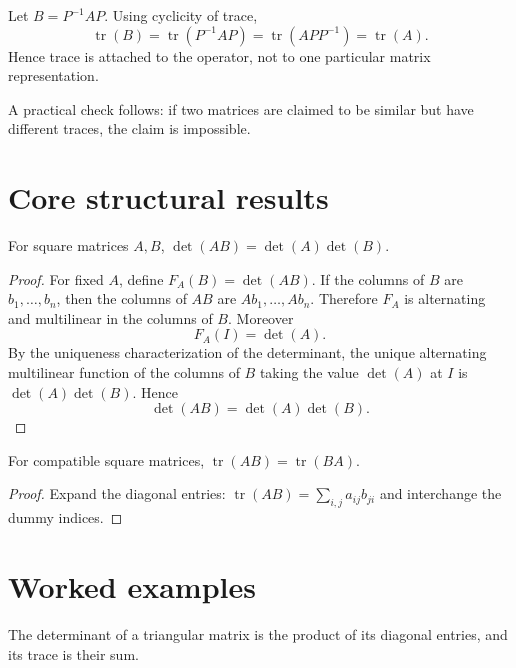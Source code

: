 \begin{example}\label{ex:i08-expand-03}
Let \(B=P^{-1}AP\). Using cyclicity of trace,
\[
\operatorname{tr}(B)
=\operatorname{tr}(P^{-1}AP)
=\operatorname{tr}(APP^{-1})
=\operatorname{tr}(A).
\]
Hence trace is attached to the operator, not to one particular matrix
representation.

A practical check follows: if two matrices are claimed to be similar but have
different traces, the claim is impossible.
\end{example}
\section{Core structural results}

\begin{theorem}\label{thm:i08-01}
For square matrices $A,B$, $\det(AB)=\det(A)\det(B)$.
\begin{proof}
For fixed \(A\), define \(F_A(B)=\det(AB)\). If the columns of \(B\) are
\(b_1,\ldots,b_n\), then the columns of \(AB\) are \(Ab_1,\ldots,Ab_n\).
Therefore \(F_A\) is alternating and multilinear in the columns of \(B\).
Moreover
\[
F_A(I)=\det(A).
\]
By the uniqueness characterization of the determinant, the unique alternating
multilinear function of the columns of \(B\) taking the value \(\det(A)\) at
\(I\) is \(\det(A)\det(B)\). Hence
\[
\det(AB)=\det(A)\det(B).
\]
\end{proof}
\end{theorem}

\begin{theorem}\label{thm:i08-02}
For compatible square matrices, $\operatorname{tr}(AB)=\operatorname{tr}(BA)$.
\begin{proof}
Expand the diagonal entries: $\operatorname{tr}(AB)=\sum_{i,j}a_{ij}b_{ji}$ and interchange the dummy indices.
\end{proof}
\end{theorem}

\section{Worked examples}

\begin{example}\label{ex:i08-worked-01}
The determinant of a triangular matrix is the product of its diagonal entries, and its trace is their sum.
\end{example}

